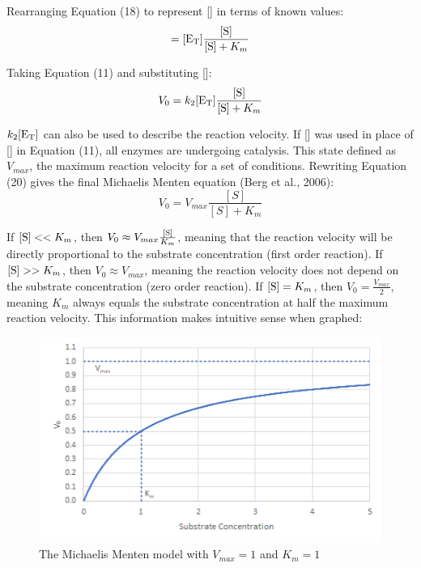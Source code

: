 \documentclass{article}
\begin{document}
Rearranging Equation (18) to represent [] in terms of known values:
\begin{equation}
    [\ce{ES}] = [\ce{E_T}]\frac{[\ce{S}]}{[\ce{S}] + K_m}
\end{equation}

Taking Equation (11) and substituting []:
\begin{equation}
    V_0 = k_2[\ce{E_T}]\frac{[\ce{S}]}{[\ce{S}] + K_m}
\end{equation}

$k_2[\ce{E_T}]$ can also be used to describe the reaction velocity. If [] was used in place of [] in Equation (11), all enzymes are undergoing catalysis. This state defined as $V_{max}$, the maximum reaction velocity for a set of conditions. Rewriting Equation (20) gives the final Michaelis Menten equation (Berg et al., 2006):
\begin{equation}
    V_0 = V_{max}\frac{[S]}{[S] + K_m}
\end{equation}

If $[\ce{S}] << K_m$, then $V_0 \approx V_{max}\frac{[\ce{S}]}{K_m}$, meaning that the reaction velocity will be directly proportional to the substrate concentration (first order reaction). If $[\ce{S}] >> K_m$, then $V_0 \approx V_{max}$, meaning the reaction velocity does not depend on the substrate concentration (zero order reaction). If $[\ce{S}] = K_m$, then $V_0 = \frac{V_{max}}{2}$, meaning $K_m$ always equals the substrate concentration at half the maximum reaction velocity. This information makes intuitive sense when graphed:
\begin{figure}[H]
    \renewcommand{\figurename}{Graph}
    \setcounter{figure}{0}
    \centering
    \includegraphics{figures/graph_01.png}
    \vspace*{-12pt}
    \caption{The Michaelis Menten model with $V_{max} = 1$ and $K_m = 1$}
    \label{fig:graph1}
\end{figure}
\end{document}
